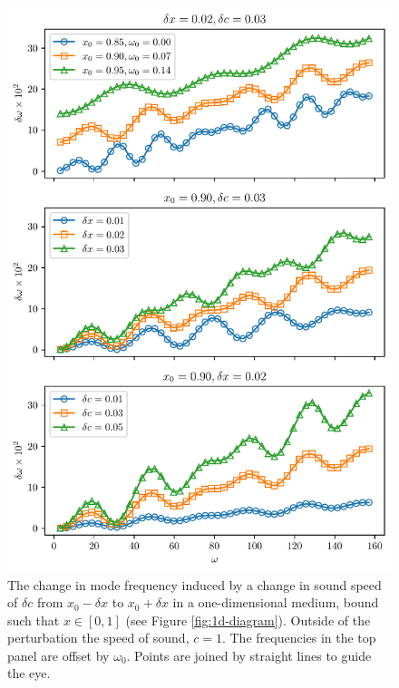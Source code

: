 \begin{figure}[!tbp]
    \centering
    \includegraphics{figures/glitch-1d-example-results.pdf}
    \caption{The change in mode frequency induced by a change in sound speed of \(\delta c\) from \(x_0 - \delta x\) to \(x_0 + \delta x\) in a one-dimensional medium, bound such that \(x \in [0, 1]\) (see Figure \ref{fig:1d-diagram}). Outside of the perturbation the speed of sound, \(c=1\).
    The frequencies in the top panel are offset by \(\omega_0\).
    Points are joined by straight lines to guide the eye.
    }
    \label{fig:1d-results}
\end{figure}

